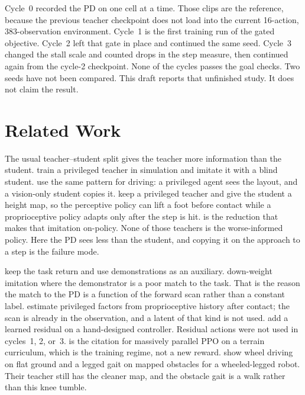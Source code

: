 \documentclass[11pt]{article}
\begin{document}
Cycle~0 recorded the PD on one cell at a time.
Those clips are the reference, because the previous teacher checkpoint does not load into the current 16-action, 383-observation environment.
Cycle~1 is the first training run of the gated objective.
Cycle~2 left that gate in place and continued the same seed.
Cycle~3 changed the stall scale and counted drops in the step measure, then continued again from the cycle-2 checkpoint.
None of the cycles passes the goal checks.
Two seeds have not been compared.
This draft reports that unfinished study.
It does not claim the result.

\section{Related Work}
\label{sec:related}

The usual teacher--student split gives the teacher more information than the student.
\textcite{lee2020quadrupedal} train a privileged teacher in simulation and imitate it with a blind student.
\textcite{chen2020learning} use the same pattern for driving: a privileged agent sees the layout, and a vision-only student copies it.
\textcite{miki2022perceptive} keep a privileged teacher and give the student a height map, so the perceptive policy can lift a foot before contact while a proprioceptive policy adapts only after the step is hit.
\textcite{ross2011dagger} is the reduction that makes that imitation on-policy.
None of those teachers is the worse-informed policy.
Here the PD sees less than the student, and copying it on the approach to a step is the failure mode.

\textcite{rajeswaran2018dapg} keep the task return and use demonstrations as an auxiliary.
\textcite{zhang2021cail} down-weight imitation where the demonstrator is a poor match to the task.
That is the reason the match to the PD is a function of the forward scan rather than a constant label.
\textcite{kumar2021rma} estimate privileged factors from proprioceptive history after contact; the scan is already in the observation, and a latent of that kind is not used.
\textcite{johannink2019residual} add a learned residual on a hand-designed controller.
Residual actions were not used in cycles~1, 2, or~3.
\textcite{rudin2022walk} is the citation for massively parallel PPO on a terrain curriculum, which is the training regime, not a new reward.
\textcite{lee2024wheeled} show wheel driving on flat ground and a legged gait on mapped obstacles for a wheeled-legged robot.
Their teacher still has the cleaner map, and the obstacle gait is a walk rather than this knee tumble.
\end{document}
